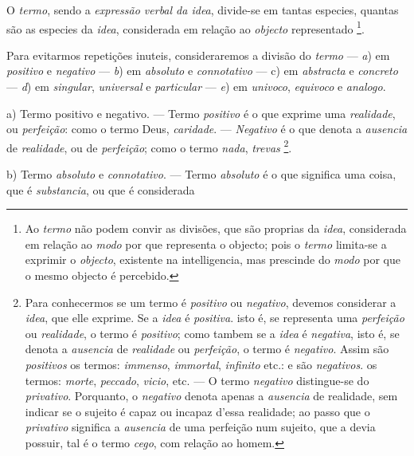 
 
O \emph{termo}, sendo a \emph{expressão verbal da idea}, divide-se em tantas especies, quantas são as especies da \emph{idea}, considerada em relação ao \emph{objecto} representado \footnote{Ao \emph{termo} não podem convir as divisões, que são proprias da \emph{idea}, considerada em relação ao \emph{modo} por que representa o objecto; pois o \emph{termo} limita-se a exprimir o \emph{objecto}, existente na intelligencia, mas prescinde do \emph{modo} por que o mesmo objecto é percebido.}.

Para evitarmos repetições inuteis, consideraremos a divisão do \emph{termo} --- \emph{a}) em \emph{positivo} e \emph{negativo} --- \emph{b}) em \emph{absoluto} e \emph{connotativo} --- c) em \emph{abstracta} e \emph{concreto} --- \emph{d}) em \emph{singular}, \emph{universal} e \emph{particular} --- \emph{e}) em \emph{univoco}, \emph{equivoco} e \emph{analogo}.

a) Termo positivo e negativo. --- Termo \emph{positivo} é o que exprime uma \emph{realidade}, ou \emph{perfeição}: como o termo Deus, \emph{caridade}. --- \emph{Negativo} é o que denota a \emph{ausencia} de \emph{realidade}, ou de \emph{perfeição}; como o termo \emph{nada}, \emph{trevas} \footnote{Para conhecermos se um termo é \emph{positivo} ou \emph{negativo}, devemos considerar a \emph{idea}, que elle exprime. Se a \emph{idea} é \emph{positiva}. isto é, se representa uma \emph{perfeição} ou \emph{realidade}, o termo é \emph{positivo}; como tambem se a \emph{idea} é \emph{negativa}, isto é, se denota a \emph{ausencia} de \emph{realidade} ou \emph{perfeição}, o termo é \emph{negativo}. Assim são \emph{positivos} os termos: \emph{immenso}, \emph{immortal}, \emph{infinito} etc.: e são \emph{negativos}. os termos: \emph{morte}, \emph{peccado}, \emph{vicio}, etc. --- O termo \emph{negativo} distingue-se do \emph{privativo}. Porquanto, o \emph{negativo} denota apenas a \emph{ausencia} de realidade, sem indicar se o sujeito é capaz ou incapaz d'essa realidade; ao passo que o \emph{privativo} significa a \emph{ausencia} de uma perfeição num sujeito, que a devia possuir, tal é o termo \emph{cego}, com relação ao homem.}.

b) Termo \emph{absoluto} e \emph{connotativo}. --- Termo \emph{absoluto} é o que significa uma coisa, que é \emph{substancia}, ou que é considerada

